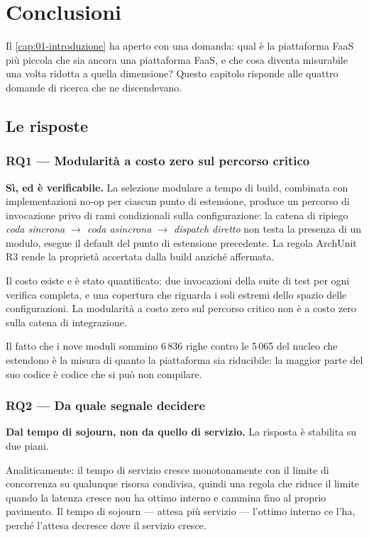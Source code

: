 \chapter{Conclusioni}
\label{cap:29-conclusioni}

Il \cref{cap:01-introduzione} ha aperto con una domanda: qual \`e la piattaforma
FaaS pi\`u piccola che sia ancora una piattaforma FaaS, e che cosa diventa
misurabile una volta ridotta a quella dimensione? Questo capitolo risponde alle
quattro domande di ricerca che ne discendevano.

\section{Le risposte}

\subsection{RQ1 --- Modularit\`a a costo zero sul percorso critico}

\textbf{S\`i, ed \`e verificabile.} La selezione modulare a tempo di build,
combinata con implementazioni no-op per ciascun punto di estensione, produce un
percorso di invocazione privo di rami condizionali sulla configurazione: la
catena di ripiego \emph{coda sincrona $\to$ coda asincrona $\to$ dispatch
diretto} non testa la presenza di un modulo, esegue il default del punto di
estensione precedente. La regola ArchUnit R3 rende la propriet\`a accertata dalla
build anzich\'e affermata.

Il costo esiste e \`e stato quantificato: due invocazioni della suite di test per
ogni verifica completa, e una copertura che riguarda i soli estremi dello spazio
delle configurazioni. La modularit\`a a costo zero sul percorso critico non \`e a
costo zero sulla catena di integrazione.

Il fatto che i nove moduli sommino 6\,836 righe contro le 5\,065 del nucleo che
estendono \`e la misura di quanto la piattaforma sia riducibile: la maggior parte
del suo codice \`e codice che si pu\`o non compilare.

\subsection{RQ2 --- Da quale segnale decidere}

\textbf{Dal tempo di sojourn, non da quello di servizio.} La risposta \`e
stabilita su due piani.

Analiticamente: il tempo di servizio cresce monotonamente con il limite di
concorrenza su qualunque risorsa condivisa, quindi una regola che riduce il
limite quando la latenza cresce non ha ottimo interno e cammina fino al proprio
pavimento. Il tempo di sojourn --- attesa pi\`u servizio --- l'ottimo interno ce
l'ha, perch\'e l'attesa decresce dove il servizio cresce.

